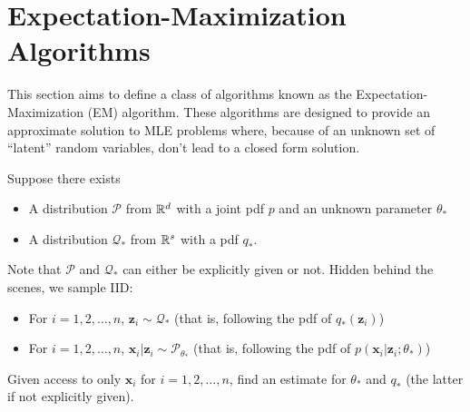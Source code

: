 \section{Expectation-Maximization Algorithms}
This section aims to define a class of algorithms known as the Expectation-Maximization (EM) algorithm. These algorithms are designed to provide an approximate solution to MLE problems where, because of an unknown set of ``latent'' random variables, don't lead to a closed form solution.
\begin{definition}
    Suppose there exists 
    \begin{itemize}
        \item A distribution $\mathcal{P}$ from $\mathbb{R}^d$ with a joint pdf $p$ and an unknown parameter $\theta_*$
        \item A distribution $\mathcal{Q}_*$ from $\mathbb{R}^s$ with a pdf $q_*$.
    \end{itemize}
    Note that $\mathcal{P}$ and $\mathcal{Q}_*$ can either be explicitly given or not. Hidden behind the scenes, we sample IID:
    \begin{itemize}
        \item For $i=1,2,\dots,n$, $\mathbf{z}_i\sim\mathcal{Q}_*$ (that is, following the pdf of $q_*(\mathbf{z}_i)$)
        \item For $i=1,2,\dots,n$, $\mathbf{x}_i|\mathbf{z}_i\sim\mathcal{P}_{\theta_*}$ (that is, following the pdf of $p(\mathbf{x}_i|\mathbf{z}_i;\theta_*)$)
    \end{itemize}
    Given access to only $\mathbf{x}_i$ for $i=1,2,\dots,n$, find an estimate for $\theta_*$ and $q_*$ (the latter if not explicitly given).
\end{definition}
